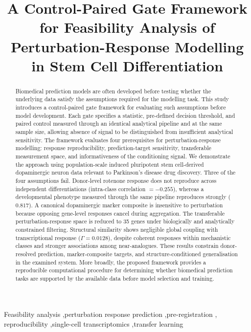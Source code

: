 \documentclass[5p,times,twocolumn]{elsarticle}
\begin{document}
\begin{frontmatter}

\title{A Control-Paired Gate Framework for Feasibility Analysis of Perturbation-Response Modelling in Stem Cell Differentiation}





\begin{abstract}
Biomedical prediction models are often developed before testing whether the
underlying data satisfy the assumptions required for the modelling task. This
study introduces a control-paired gate framework for evaluating such
assumptions before model development. Each gate specifies a statistic,
pre-defined decision threshold, and paired control measured through an
identical analytical pipeline and at the same sample size, allowing absence of
signal to be distinguished from insufficient analytical sensitivity. The
framework evaluates four prerequisites for perturbation-response modelling:
response reproducibility, prediction-target sensitivity, transferable
measurement space, and informativeness of the conditioning signal. We
demonstrate the approach using population-scale induced pluripotent stem
cell-derived dopaminergic neuron data relevant to Parkinson's disease drug
discovery. Three of the four assumptions fail. Donor-level rotenone response
does not reproduce across independent differentiations
(intra-class correlation $=-0.255$), whereas a developmental phenotype
measured through the same pipeline reproduces strongly ($0.817$). A canonical
dopaminergic marker composite is insensitive to perturbation because opposing
gene-level responses cancel during aggregation. The transferable
perturbation-response space is reduced to 35 genes under biologically and
analytically constrained filtering. Structural similarity shows negligible
global coupling with transcriptional response ($\Gamma=0.0128$), despite
coherent responses within mechanistic classes and stronger associations among
near-analogues. These results constrain donor-resolved prediction,
marker-composite targets, and structure-conditioned generalisation in the
examined system. More broadly, the proposed framework provides a reproducible
computational procedure for determining whether biomedical prediction tasks
are supported by the available data before model selection and training.
\end{abstract}

\begin{keyword}
Feasibility analysis \sep perturbation response prediction \sep pre-registration \sep
reproducibility \sep single-cell transcriptomics \sep transfer learning
\end{keyword}

\end{frontmatter}
\end{document}
